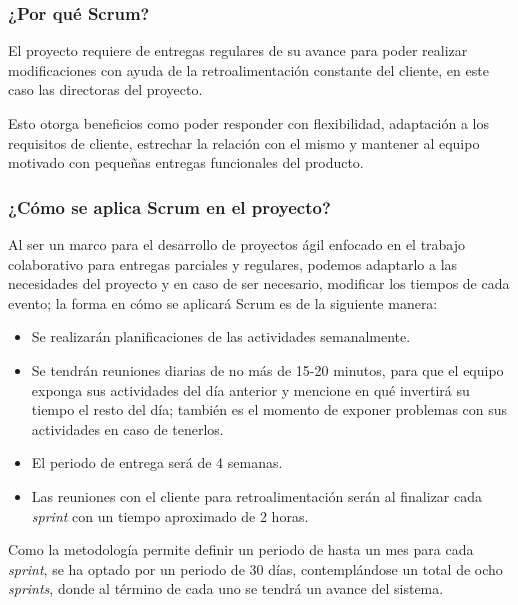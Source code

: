 \subsubsection*{¿Por qué Scrum?}
El proyecto requiere de entregas regulares de su avance para poder realizar modificaciones con ayuda de la retroalimentación constante del cliente, en este caso las directoras del proyecto.


Esto otorga beneficios como poder responder con flexibilidad, adaptación a los requisitos de cliente, estrechar la relación con el mismo y mantener al equipo motivado con pequeñas entregas funcionales del producto.

\subsubsection*{¿Cómo se aplica Scrum en el proyecto?}

Al ser un marco para el desarrollo de proyectos ágil enfocado en el trabajo colaborativo para entregas parciales y regulares, podemos adaptarlo a las necesidades del proyecto y en caso de ser necesario, modificar los tiempos de cada  evento; la forma en cómo se aplicará Scrum es de la siguiente manera:
\begin{itemize}
	\item Se realizarán planificaciones de las actividades semanalmente.
	\item Se tendrán reuniones diarias de no más de 15-20 minutos, para que el equipo exponga sus actividades del día anterior y mencione en qué invertirá su tiempo el resto del día; también es el momento de exponer problemas con sus actividades en caso de tenerlos.
	\item El periodo de entrega será de 4 semanas.
	\item Las reuniones con el cliente para retroalimentación serán al finalizar cada \textit{sprint} con un tiempo aproximado de 2 horas.
\end{itemize}


Como la metodología permite definir un periodo de hasta un mes para cada \textit{sprint}, se ha optado por un periodo de 30 días, contemplándose un total de ocho \textit{sprints}, donde al término de cada uno se tendrá un avance del sistema.